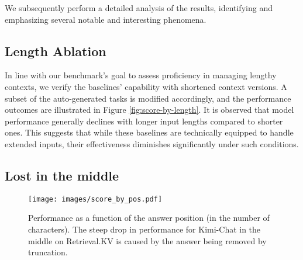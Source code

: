 We subsequently perform a detailed analysis of the results, identifying and emphasizing several notable and interesting phenomena.

\subsection{Length Ablation}

In line with our benchmark's goal to assess proficiency in managing lengthy contexts, we verify the baselines' capability with shortened context versions. A subset of the auto-generated tasks is modified accordingly, and the performance outcomes are illustrated in Figure \ref{fig:score-by-length}. It is observed that model performance generally declines with longer input lengths compared to shorter ones. This suggests that while these baselines are technically equipped to handle extended inputs, their effectiveness diminishes significantly under such conditions.

\subsection{Lost in the middle}
\begin{figure*}[!ht]
    \centering
    \texttt{[image: images/score\_by\_pos.pdf]}
    \caption{Performance as a function of the answer position (in the number of characters). The steep drop in performance for Kimi-Chat in the middle on Retrieval.KV is caused by the answer being removed by truncation.}
    \label{fig:performance-by-answer-pos}
\end{figure*}

